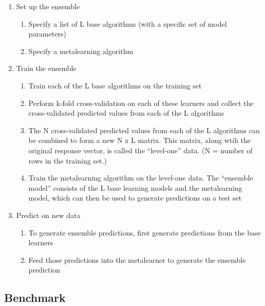 \documentclass{article}
\begin{document}
\begin{enumerate}
    \item Set up the ensemble
    \begin{enumerate}
        \item Specify a list of L base algorithms (with a specific set of model parameters)
        \item Specify a metalearning algorithm
    \end{enumerate}
    \item Train the ensemble
    \begin{enumerate}
        \item Train each of the L base algorithms on the training set
        \item Perform k-fold cross-validation on each of these learners and collect the cross-validated predicted values from each of the L algorithms
        \item The N cross-validated predicted values from each of the L algorithms can be combined to form a new N x L matrix. This matrix, along wtih the original response vector, is called the “level-one” data. (N = number of rows in the training set.)
        \item Train the metalearning algorithm on the level-one data. The “ensemble model” consists of the L base learning models and the metalearning model, which can then be used to generate predictions on a test set
    \end{enumerate}
    \item Predict on new data
    \begin{enumerate}
        \item To generate ensemble predictions, first generate predictions from the base learners
        \item Feed those predictions into the metalearner to generate the ensemble prediction
    \end{enumerate}
\end{enumerate}



\subsection{Benchmark}
\end{document}

